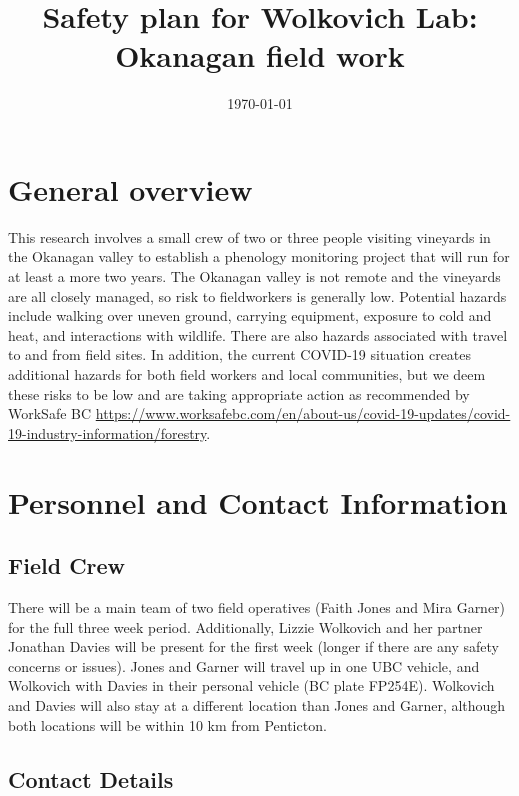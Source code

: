 \documentclass[11pt,letter]{article}
\begin{document}

\renewcommand{\refname}{\CHead{}}

\title{Safety plan for Wolkovich Lab: Okanagan field work}
\date{\today}
\maketitle
\tableofcontents

\section{General overview}
This research involves a small crew of two or three people visiting vineyards in the Okanagan valley to establish a phenology monitoring project that will run for at least a more two years. The Okanagan valley is not remote and the vineyards are all closely managed, so risk to fieldworkers is generally low. Potential hazards include walking over uneven ground, carrying equipment, exposure to cold and heat, and interactions with wildlife. There are also hazards associated with travel to and from field sites. In addition, the current COVID-19 situation creates additional hazards for both field workers and local communities, but we deem these risks to be low and are taking appropriate action as recommended by WorkSafe BC \url{https://www.worksafebc.com/en/about-us/covid-19-updates/covid-19-industry-information/forestry}. 

\section{Personnel and Contact Information}

\subsection {Field Crew}

There will be a main team of two field operatives (Faith Jones and Mira Garner) for the full three week period. Additionally, Lizzie Wolkovich and her partner Jonathan Davies will be present for the first week (longer if there are any safety concerns or issues).  Jones and Garner will travel up in one UBC vehicle, and Wolkovich with Davies in their personal vehicle (BC plate FP254E). Wolkovich and Davies will also stay at a different location than Jones and Garner, although both locations will be within 10 km from Penticton.   

\subsection {Contact Details}
\end{document}
